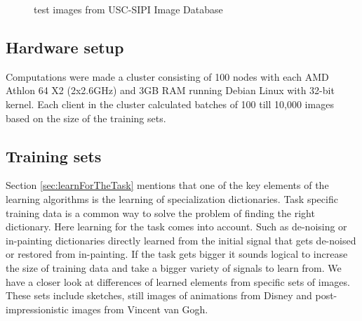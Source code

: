 \begin{figure}[h]
\hspace{5mm}
\hspace{5mm}
\caption{test images from USC-SIPI Image Database}
\label{fig:USC-SIPI}
\end{figure}

\subsection{Hardware setup} 
Computations were made a cluster consisting of 100 nodes with each AMD Athlon 64
X2 (2x2.6GHz) and 3GB RAM running Debian Linux with 32-bit kernel. Each client
in the cluster calculated batches of 100 till 10,000 images based on the size of
the training sets.

\subsection{Training sets}
Section \ref{sec:learnForTheTask} mentions that one of the key
elements of the learning algorithms is the learning of specialization
dictionaries. Task specific training data is a common way to solve the problem
of finding  the right dictionary. Here learning for the task comes into
account. Such as de-noising or in-painting dictionaries directly learned from
the initial signal that gets de-noised or restored from in-painting. If the task
gets bigger it sounds logical to increase the size of training data and take a
bigger variety of signals to learn from.  We have a closer look at differences
of learned elements from specific sets of images. These sets include sketches,
still images of animations from Disney and post-impressionistic images from
Vincent van Gogh.  

